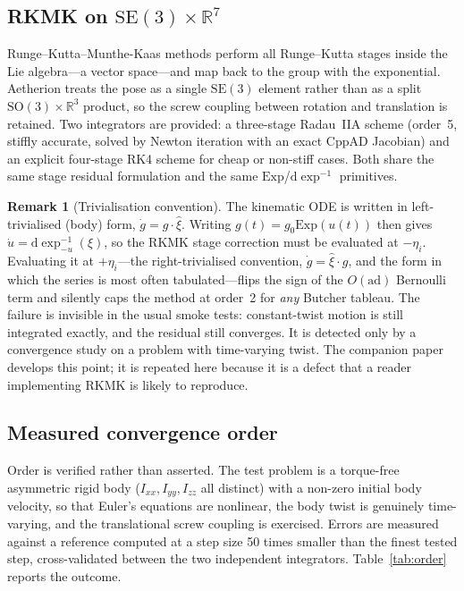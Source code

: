 \documentclass[a4paper,10pt]{article}
\newcommand{\SO}{\mathrm{SO}(3)}
\newcommand{\SE}{\mathrm{SE}(3)}
\newcommand{\Exp}{\mathrm{Exp}}
\newcommand{\dexp}{\mathrm{d}\exp}
\newcommand{\ad}{\mathrm{ad}}
\newcommand{\R}{\mathbb{R}}
\theoremstyle{definition}
\newtheorem{remark}{Remark}
\begin{document}
\subsection{RKMK on $\SE \times \R^{7}$}

Runge--Kutta--Munthe-Kaas methods \citep{muntheKaas1998,iserles2000liegroup}
perform all Runge--Kutta stages inside the Lie algebra---a vector space---and
map back to the group with the exponential.  Aetherion treats the pose as a
single $\SE$ element rather than as a split $\SO \times \R^3$ product, so the
screw coupling between rotation and translation is retained.  Two integrators
are provided: a three-stage Radau~IIA scheme (order~5, stiffly accurate,
solved by Newton iteration with an exact CppAD Jacobian) and an explicit
four-stage RK4 scheme for cheap or non-stiff cases.  Both share the same stage
residual formulation and the same $\Exp$/$\dexp^{-1}$ primitives.

\begin{remark}[Trivialisation convention]
\label{rem:trivialisation}
The kinematic ODE is written in left-trivialised (body) form,
$\dot g = g \cdot \hat\xi$.  Writing $g(t) = g_0\Exp(u(t))$ then gives
$\dot u = \dexp^{-1}_{-u}(\xi)$, so the RKMK stage correction must be evaluated at
$-\eta_i$.  Evaluating it at $+\eta_i$---the right-trivialised convention,
$\dot g = \hat\xi \cdot g$, and the form in which the series is most often
tabulated---flips the sign of the $O(\ad)$ Bernoulli term and silently caps
the method at order~2 for \emph{any} Butcher tableau.  The failure is
invisible in the usual smoke tests: constant-twist motion is still integrated
exactly, and the residual still converges.  It is detected only by a
convergence study on a problem with time-varying twist.  The companion paper
\citep{tuncer2027rkmk} develops this point; it is repeated here because it is
a defect that a reader implementing RKMK is likely to reproduce.
\end{remark}

\subsection{Measured convergence order}

Order is verified rather than asserted.  The test problem is a torque-free
asymmetric rigid body ($I_{xx}, I_{yy}, I_{zz}$ all distinct) with a non-zero
initial body velocity, so that Euler's equations are nonlinear, the body twist
is genuinely time-varying, and the translational screw coupling is exercised.
Errors are measured against a reference computed at a step size 50 times
smaller than the finest tested step, cross-validated between the two
independent integrators.  Table~\ref{tab:order} reports the outcome.
\end{document}
